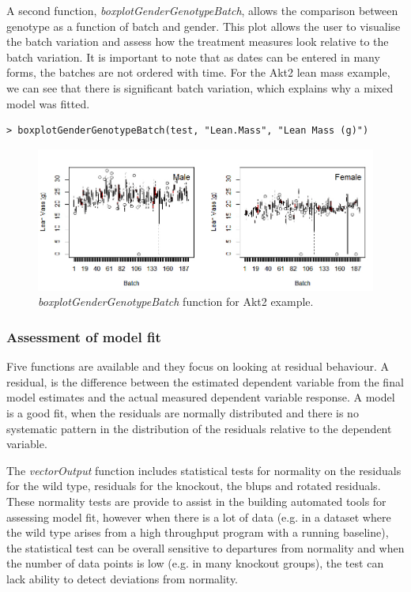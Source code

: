 \documentclass[12pt,a4paper]{article}
\begin{document}
A second function, \textit{boxplotGenderGenotypeBatch}, allows the comparison between genotype as a function of batch and gender.  
This plot allows the user to visualise the batch variation and assess how the treatment measures look relative to the batch variation. 
It is important to note that as dates can be entered in many forms, the batches are not ordered with time. 
For the Akt2 lean mass example, we can see that there is significant batch variation, which explains why a mixed model was fitted.

\begingroup
    \fontsize{8pt}{12pt}\selectfont
\begin{verbatim}
> boxplotGenderGenotypeBatch(test, "Lean.Mass", "Lean Mass (g)")
\end{verbatim}
\endgroup 

\begin{figure}[H]%
\centerline{\includegraphics[scale=0.5]{cs1_boxplotBatchGenotype.jpg}}
\caption{\textit{boxplotGenderGenotypeBatch} function for Akt2 example.}\label{fig:15}
\end{figure}

\subsubsection{Assessment of model fit}

Five functions are available and they focus on looking at residual behaviour. 
A residual, is the difference between the estimated dependent variable from the final model estimates and the actual measured dependent variable response. 
A model is a good fit, when the residuals are normally distributed and there is no systematic pattern in the distribution of the residuals relative to the dependent variable. 

The \textit{vectorOutput} function includes statistical tests for normality on the residuals for the wild type, residuals for the knockout, the blups and rotated residuals. 
These normality tests are provide to assist in the building automated tools for assessing model fit, 
however when there is a lot of data (e.g. in a dataset where the wild type arises from a high throughput program with a running baseline), 
the statistical test can be overall sensitive to departures from normality and when the number of data points is low (e.g. in many knockout groups), the test can lack ability to detect deviations from normality. 
\end{document}
